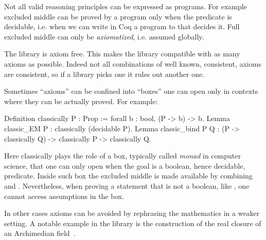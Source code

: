 
Not all valid reasoning principles can be expressed as programs.
For example excluded middle can be proved by a program only when
the predicate is decidable, i.e. when we can write in Coq a program
to  that decides it.
Full excluded middle can only be \emph{axiomatized}, i.e. assumed globally.

The \mcbMC{} library is axiom free.  This makes the library compatible
with as many axioms as possible.  Indeed not all combinations of well
known, consistent, axioms are consistent, so if a library picks
one it rules out another one.

Sometimes ``axioms'' can be confined into ``boxes'' one can open
only in contexts where they can be actually proved.  For example:

\begin{coq}{}{}
Definition classically P : Prop := forall b : bool, (P -> b) -> b.
Lemma classic_EM P : classically (decidable P).
Lemma classic_bind P Q :
  (P -> classically Q) -> classically P -> classically Q.
\end{coq}
Here classically plays the role of a box, typically called \emph{monad}
in computer science, that one can only open when the goal is a boolean,
hence decidable, predicate.  Inside such box the excluded middle is
made available by combining  and .
Nevertheless, when proving a statement that is not a boolean, like
, one cannot access assumptions in the  box.

In other cases axioms can be avoided by rephrasing the mathematics
in a weaker setting.  A notable example in the \mcbMC{} library
is the construction of the real closure of an Archimedian field~\cite{cyril}.

